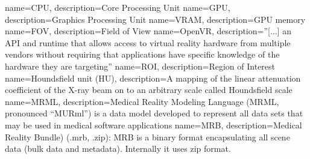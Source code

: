 
\makeglossaries

{
	name=CPU,
	description={Core Processing Unit}
}
{
	name=GPU,
	description={Graphics Processing Unit}
}
{
	name=VRAM,
	description={GPU memory}
}
{
	name=FOV,
	description={Field of View}
}
{
name=OpenVR,
description={''[...] an API and runtime that allows access to virtual reality hardware from multiple vendors without requiring that applications have specific knowledge of the hardware they are targeting''\cite{valvesoftwareOpenVRSDK2024}}
}
{
	name=ROI,
	description={Region of Interest}
}
{
	name=Houndsfield unit (HU),
	description={A mapping of the linear attenuation coefficient of the X-ray beam on to an arbitrary scale called Houndsfield scale\cite{denotterHounsfieldUnit2024}}
}
{
	name=MRML,
	description={Medical Reality Modeling Language (MRML, pronounced “MURml”) is a data model developed to represent all data sets that may be used in medical software applications\cite{kikinis3DSlicerPlatform2014}}
}
{
	name=MRB,
	description={Medical Reality Bundle) (.mrb, .zip): MRB is a binary format encapsulating all scene data (bulk data and metadata). Internally it uses zip format. \cite{kikinis3DSlicerPlatform2014}}
}
